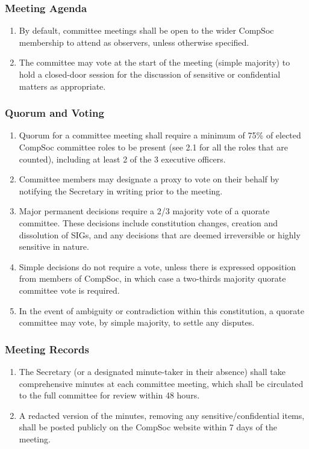 \subsubsection{Meeting Agenda}  
\begin{enumerate}
    \item By default, committee meetings shall be open to the wider CompSoc membership to attend as observers, unless otherwise specified.
    \item The committee may vote at the start of the meeting (simple majority) to hold a closed-door session for the discussion of sensitive or confidential matters as appropriate.  
\end{enumerate}

\subsubsection{Quorum and Voting}
\begin{enumerate}
    \item Quorum for a committee meeting shall require a minimum of 75\% of elected CompSoc committee roles to be present (see 2.1 for all the roles that are counted), including at least 2 of the 3 executive officers.
    \item Committee members may designate a proxy to vote on their behalf by notifying the Secretary in writing prior to the meeting.
    \item Major permanent decisions require a 2/3 majority vote of a quorate committee. These decisions include constitution changes, creation and dissolution of SIGs, and any decisions that are deemed irreversible or highly sensitive in nature.
    \item Simple decisions do not require a vote, unless there is expressed opposition from members of CompSoc, in which case a two-thirds majority quorate committee vote is required.
    \item In the event of ambiguity or contradiction within this constitution, a quorate committee may vote, by simple majority, to settle any disputes.
\end{enumerate}

\subsubsection{Meeting Records}
\begin{enumerate}
    \item The Secretary (or a designated minute-taker in their absence) shall take comprehensive minutes at each committee meeting, which shall be circulated to the full committee for review within 48 hours.
    \item A redacted version of the minutes, removing any sensitive/confidential items, shall be posted publicly on the CompSoc website within 7 days of the meeting.
\end{enumerate}

